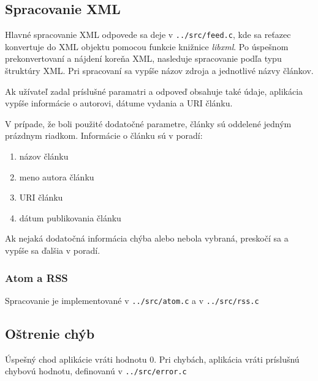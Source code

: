 \subsection*{Spracovanie XML}
Hlavné spracovanie XML odpovede sa deje v {\tt ../src/feed.c}, kde sa reťazec konvertuje do XML objektu pomocou funkcie knižnice {\it libxml}. Po úspešnom prekonvertovaní a nájdení koreňa XML, nasleduje spracovanie podľa typu štruktúry XML. Pri spracovaní sa vypíše názov zdroja a jednotlivé názvy článkov. 

Ak užívateľ zadal príslušné paramatri a odpoveď obsahuje také údaje, aplikácia vypíše informácie o autorovi, dátume vydania a URI článku. 

V prípade, že boli použité dodatočné parametre, články sú oddelené jedným prázdnym riadkom. Informácie o článku sú v poradí:
\begin{enumerate}
  \item{názov článku}
  \item{meno autora článku}
  \item{URI článku}
  \item{dátum publikovania článku}
\end{enumerate}

Ak nejaká dodatočná informácia chýba alebo nebola vybraná, preskočí sa a vypíše sa ďalšia v poradí.

\subsubsection{Atom a RSS}
Spracovanie je implementované v {\tt ../src/atom.c} a v {\tt ../src/rss.c}

\subsection*{Oštrenie chýb}
\label{err_label}
Úspešný chod aplikácie vráti hodnotu 0. Pri chybách, aplikácia vráti príslušnú chybovú hodnotu, definovanú v {\tt ../src/error.c}

